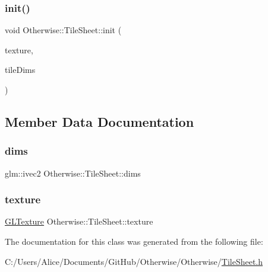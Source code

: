 \mbox{\label{class_otherwise_1_1_tile_sheet_accf781918ebe300e907873e3dc4e612c}} 
\subsubsection{\texorpdfstring{init()}{init()}}
{\footnotesize\ttfamily void Otherwise\+::\+Tile\+Sheet\+::init (\begin{DoxyParamCaption}\item[{const \hyperlink{struct_otherwise_1_1_g_l_texture}{G\+L\+Texture} \&}]{texture,  }\item[{const glm\+::ivec2 \&}]{tile\+Dims }\end{DoxyParamCaption})\hspace{0.3cm}{\ttfamily [inline]}}



\subsection{Member Data Documentation}
\mbox{\label{class_otherwise_1_1_tile_sheet_a407eb2284a5bd149b86c198dbab5d733}} 
\subsubsection{\texorpdfstring{dims}{dims}}
{\footnotesize\ttfamily glm\+::ivec2 Otherwise\+::\+Tile\+Sheet\+::dims}

\mbox{\label{class_otherwise_1_1_tile_sheet_a8d8adb1ce13204e31f9e9bfdce75b3b2}} 
\subsubsection{\texorpdfstring{texture}{texture}}
{\footnotesize\ttfamily \hyperlink{struct_otherwise_1_1_g_l_texture}{G\+L\+Texture} Otherwise\+::\+Tile\+Sheet\+::texture}



The documentation for this class was generated from the following file\+:\begin{DoxyCompactItemize}
\item 
C\+:/\+Users/\+Alice/\+Documents/\+Git\+Hub/\+Otherwise/\+Otherwise/\hyperlink{_tile_sheet_8h}{Tile\+Sheet.\+h}\end{DoxyCompactItemize}
